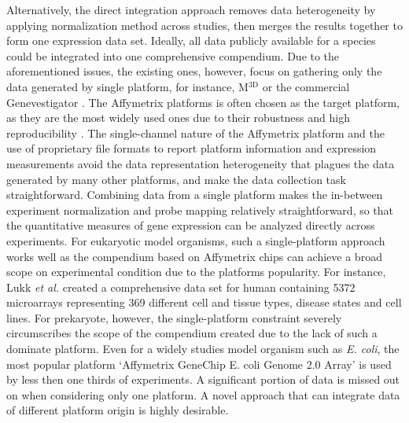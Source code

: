 Alternatively, the direct integration approach removes data heterogeneity by
applying normalization method across studies, then merges the results together
to form one expression data set.
%
Ideally, all data publicly available for a species could be integrated into
one comprehensive compendium.
%
Due to the aforementioned issues, the existing ones, however, focus on gathering
only the data generated by single platform, for instance, M$^{\textrm{3D}}$
\cite{Faith2008} or the commercial Genevestigator \cite{Hruz2008}.
%
The Affymetrix platforms is often chosen as the target platform, as they are the
most widely used ones due to their robustness and high reproducibility
\cite{Bammler2005, Irizarry2005}.
%
The single-channel nature of the Affymetrix platform and the use of proprietary
file formats to report platform information and expression measurements avoid
the data representation heterogeneity that plagues the data generated by many
other platforms, and make the data collection task straightforward.
%
Combining data from a single platform makes the in-between experiment
normalization and probe mapping relatively straightforward, so that the
quantitative measures of gene expression can be analyzed directly across
experiments.
%
%
For eukaryotic model organisms, such a single-platform approach works well as
the compendium based on Affymetrix chips can achieve a broad scope on
experimental condition due to the platforms popularity.
%
For instance, Lukk \textit{et al.} \cite{Lukk2010} created a comprehensive data
set for human containing 5372 microarrays representing 369 different cell and
tissue types, disease states and cell lines.
%
For prekaryote, however, the single-platform constraint severely circumscribes
the scope of the compendium created due to the lack of such a dominate platform.
%
Even for a widely studies model organism such as {\it E. coli}, the most popular
platform `Affymetrix GeneChip E. coli Genome 2.0 Array' is used by less then one
thirds of experiments.  A significant portion of data is missed out on when
considering only one platform.
%
A novel approach that can integrate data of different platform origin is highly
desirable.



